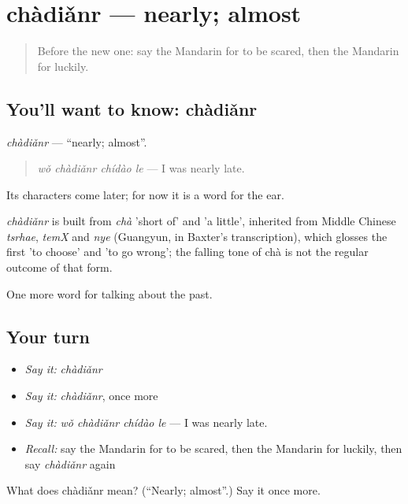 \section[chàdiǎnr]{chàdiǎnr — nearly; almost}

\label{lesson:ZH-C236-chadianr}



\begin{quote}
Before the new one: say the Mandarin for to be scared, then the Mandarin for luckily.
\end{quote}

\subsection*{You'll want to know: chàdiǎnr}
\emph{chàdiǎnr} — \textquotedblleft{}nearly; almost\textquotedblright{}.

\begin{quote}
\emph{wǒ chàdiǎnr chídào le} — I was nearly late.
\end{quote}

Its characters come later; for now it is a word for the ear.

\begin{cousinweb}
\emph{chàdiǎnr} is built from \emph{chà} 'short of' and  'a little', inherited from Middle Chinese \emph{tsrhae}, \emph{temX} and \emph{nye} (Guangyun, in Baxter's transcription), which glosses the first 'to choose' and 'to go wrong'; the falling tone of chà is not the regular outcome of that form.
\end{cousinweb}

\begin{grammarlens}[title={What you've built}]
One more word for talking about the past.
\end{grammarlens}

\subsection*{Your turn}
\begin{itemize}
\raggedright
  \item \emph{Say it:} \emph{chàdiǎnr}
  \item \emph{Say it:} \emph{chàdiǎnr}, once more
  \item \emph{Say it:} \emph{wǒ chàdiǎnr chídào le} — I was nearly late.
  \item \emph{Recall:} say the Mandarin for to be scared, then the Mandarin for luckily, then say \emph{chàdiǎnr} again
\end{itemize}

\begin{tcolorbox}[breakable,colback=teal!4,colframe=teal!35!black,title={Before you move on}]
What does chàdiǎnr mean? (\textquotedblleft{}Nearly; almost\textquotedblright{}.) Say it once more.
\end{tcolorbox}
